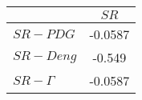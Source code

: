 \begin{tabular}{l|c}
\toprule
{} &    $SR$ \\
\midrule
\textbf{$SR-PDG$   } & -0.0587 \\
\textbf{$SR-Deng$  } &  -0.549 \\
\textbf{$SR-\Gamma$} & -0.0587 \\
\bottomrule
\end{tabular}
